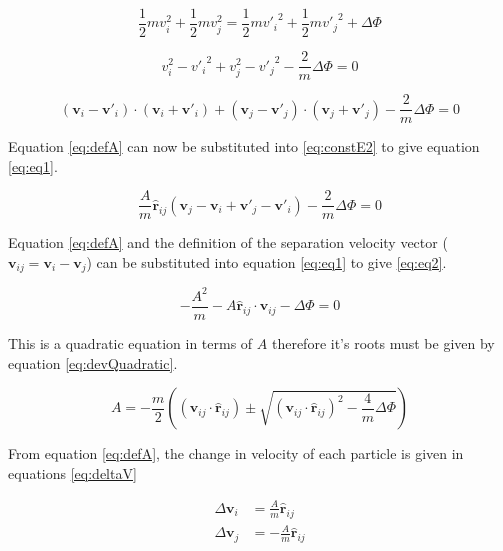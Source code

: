 \documentclass[12pt]{UoAthesis}
\begin{document}
\begin{equation}
  \label{eq:constE}
  \frac{1}{2}mv_i^2 + \frac{1}{2}mv_j^2 =
  \frac{1}{2}m{v'_i}^2 + \frac{1}{2}m{v'_j}^2 + \Delta \Phi
\end{equation}

\begin{equation}
  \label{eq:constE1}
  v_i^2 - {v'_i}^2 +
  v_j^2 - {v'_j}^2 - \frac{2}{m}\Delta \Phi = 0
\end{equation}

\begin{equation}
  \label{eq:constE2}
  (\mathbf{v}_i - \mathbf{v}'_i)\cdot(\mathbf{v}_i + \mathbf{v}'_i) +
  (\mathbf{v}_j - \mathbf{v}'_j)\cdot(\mathbf{v}_j + \mathbf{v}'_j) -
  \frac{2}{m}\Delta \Phi = 0
\end{equation}

Equation \eqref{eq:defA} can now be substituted into
\eqref{eq:constE2} to give equation \eqref{eq:eq1}.

\begin{equation}
  \label{eq:eq1}
  \frac{A}{m}\mathbf{\hat{r}}_{ij} (\mathbf{v}_j - \mathbf{v}_i 
  + \mathbf{v}'_j - \mathbf{v}'_i) - \frac{2}{m}\Delta \Phi = 0
\end{equation}

Equation \eqref{eq:defA} and the definition of the separation velocity
vector ($\mathbf{v}_{ij} = \mathbf{v}_i - \mathbf{v}_j$) can be
substituted into equation \eqref{eq:eq1} to give \eqref{eq:eq2}.

\begin{equation}
  \label{eq:eq2}
  -\frac{A^2}{m}
  -A\mathbf{\hat{r}}_{ij}\cdot\mathbf{v}_{ij} - \Delta \Phi = 0
\end{equation}

This is a quadratic equation in terms of $A$ therefore it's roots must
be given by equation \eqref{eq:devQuadratic}.

\begin{equation}
  \label{eq:devQuadratic}
  A = -\frac{m}{2}\left((\mathbf{v}_{ij}\cdot\mathbf{\hat{r}}_{ij}) \pm
  \sqrt{(\mathbf{v}_{ij}\cdot\mathbf{\hat{r}}_{ij})^2 - \frac{4}{m}\Delta \Phi}\right)
\end{equation}  

From equation \eqref{eq:defA}, the change in velocity of each particle
is given in equations \eqref{eq:deltaV}

\begin{subequations}
  \label{eq:deltaV}
  \begin{align}
    \Delta\mathbf{v}_i &= \frac{A}{m} \mathbf{\hat{r}}_{ij} \\
    \Delta\mathbf{v}_j &= -\frac{A}{m}\mathbf{\hat{r}}_{ij}    
  \end{align}
\end{subequations}
\end{document}
